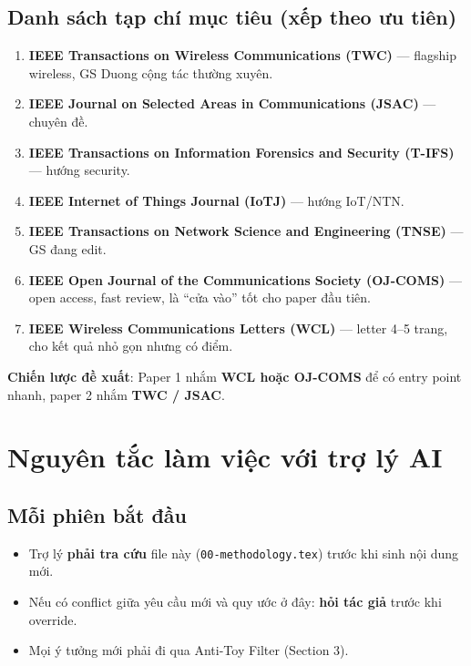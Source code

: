 \documentclass[11pt,a4paper]{article}
\begin{document}
\subsection{Danh sách tạp chí mục tiêu (xếp theo ưu tiên)}

\begin{enumerate}
  \item \textbf{IEEE Transactions on Wireless Communications (TWC)} --- flagship wireless, GS Duong cộng tác thường xuyên.
  \item \textbf{IEEE Journal on Selected Areas in Communications (JSAC)} --- chuyên đề.
  \item \textbf{IEEE Transactions on Information Forensics and Security (T-IFS)} --- hướng security.
  \item \textbf{IEEE Internet of Things Journal (IoTJ)} --- hướng IoT/NTN.
  \item \textbf{IEEE Transactions on Network Science and Engineering (TNSE)} --- GS đang edit.
  \item \textbf{IEEE Open Journal of the Communications Society (OJ-COMS)} --- open access, fast review, là ``cửa vào'' tốt cho paper đầu tiên.
  \item \textbf{IEEE Wireless Communications Letters (WCL)} --- letter 4--5 trang, cho kết quả nhỏ gọn nhưng có điểm.
\end{enumerate}

\textbf{Chiến lược đề xuất}: Paper 1 nhắm \textbf{WCL hoặc OJ-COMS} để có entry point nhanh, paper 2 nhắm \textbf{TWC / JSAC}.

\section{Nguyên tắc làm việc với trợ lý AI}

\subsection{Mỗi phiên bắt đầu}
\begin{itemize}
  \item Trợ lý \textbf{phải tra cứu} file này (\texttt{00-methodology.tex}) trước khi sinh nội dung mới.
  \item Nếu có conflict giữa yêu cầu mới và quy ước ở đây: \textbf{hỏi tác giả} trước khi override.
  \item Mọi ý tưởng mới phải đi qua Anti-Toy Filter (Section 3).
\end{itemize}
\end{document}
